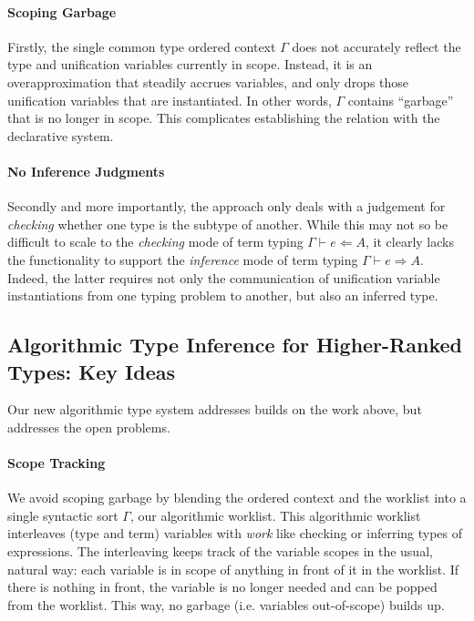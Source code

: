 \paragraph{Scoping Garbage} Firstly, the single common type ordered context 
$\Gamma$ does not accurately reflect the type and unification variables
currently in scope. Instead, it is an overapproximation that steadily accrues
variables, and only drops those unification variables that are instantiated.
In other words, $\Gamma$ contains ``garbage'' that is no longer in scope.
This complicates establishing the relation with the declarative system.


\paragraph{No Inference Judgments} 
Secondly and more importantly, the approach only deals with a judgement for
\emph{checking} whether one type is the subtype of another. While this may not
so be difficult to scale to the \emph{checking} mode of term typing $\Gamma
\vdash e \Leftarrow A$, it clearly lacks the functionality to support the
\emph{inference} mode of term typing $\Gamma \vdash e \Rightarrow A$. Indeed,
the latter requires not only the communication of unification variable
instantiations from one typing problem to another, but also an inferred type.

\subsection{Algorithmic Type Inference for Higher-Ranked Types: Key Ideas}

Our new algorithmic type system addresses builds on the work above, but
addresses the open problems.

\paragraph{Scope Tracking}
We avoid scoping garbage by blending the ordered context and the
worklist into a single syntactic sort $\Gamma$, our algorithmic worklist. This
algorithmic worklist interleaves (type and term) variables with \emph{work}
like checking or inferring types of expressions. The interleaving keeps track
of the variable scopes in the usual, natural way: each variable is in scope of
anything in front of it in the worklist. If there is nothing in front, the
variable is no longer needed and can be popped from the worklist. This way, no
garbage (i.e. variables out-of-scope) builds up.

